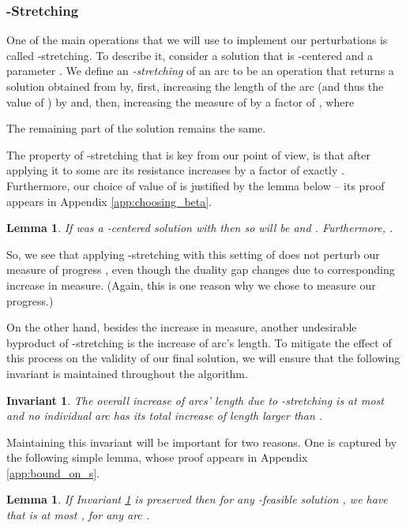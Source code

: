 \documentclass[11pt, letterpaper]{article}
\newtheorem{lemma}[theorem]{Lemma}
\newtheorem{invariant}[theorem]{Invariant}
\begin{document}
\subsubsection*{-Stretching}

One of the main operations that we will use to implement our perturbations is called -stretching. To describe it, consider a solution  that is -centered and a parameter . We define an {\em -stretching} of an arc  to be an operation that returns a solution  obtained from  by, first, increasing the length  of the arc  (and thus the value of ) by  and, then, increasing the measure  of  by a factor of , where

The remaining part of the solution remains the same.

The property of  -stretching that is key from our point of view, is that after applying it to some arc  its resistance  increases by a factor of exactly . Furthermore, our choice of value of  is justified by the lemma below -- its proof appears in Appendix \ref{app:choosing_beta}.

\begin{lemma}
\label{lem:choosing_beta}
If  was a -centered solution with  then so will be  and . Furthermore, .
\end{lemma}

So, we see that applying -stretching with this setting of  does not perturb our measure of progress , even though the duality gap  changes due to corresponding increase in measure. (Again, this is one reason why we chose  to measure our progress.)

On the other hand, besides the increase in measure, another undesirable byproduct of -stretching is the increase of arc's length. To mitigate the effect of this process on the validity of our final solution, we will ensure that the following invariant is maintained throughout the algorithm.

\begin{invariant}
\label{inv:length_upper}
The overall increase of arcs' length due to -stretching is at most  and no individual arc has its total increase of length larger than .
\end{invariant} 

\noindent Maintaining this invariant will be important for two reasons. One is captured by the following simple lemma, whose proof appears in Appendix \ref{app:bound_on_s}.

\begin{lemma}
\label{lem:bound_on_s}
If Invariant \ref{inv:length_upper} is preserved then for any -feasible solution , we have that  is at most , for any arc .
\end{lemma}
\end{document}
